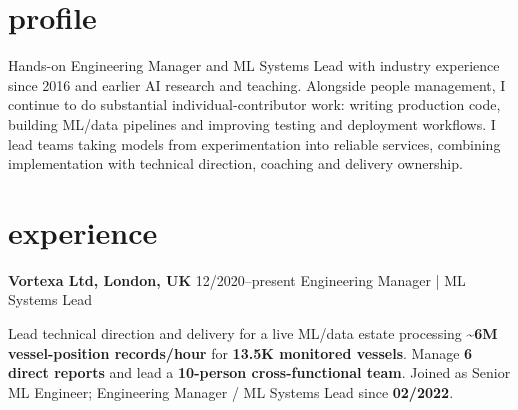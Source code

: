 \documentclass[]{../../../../friggeri-cv}
\renewcommand{\entry}[4]{%
  \parbox[t]{\dimexpr\textwidth-\entryleftinset\relax}{%
    \textbf{#2}%
    {\footnotesize\addfontfeature{Color=lightgray}\hspace{0.6em}#1}%
    \hfill%
    {\small\color{textcolor} #3}\\%
    #4\vspace{\parsep}%
  }\\}
\begin{document}
\section{profile}
{\normalsize Hands-on Engineering Manager and ML Systems Lead with industry experience since 2016 and earlier AI research and teaching. Alongside people management, I continue to do substantial individual-contributor work: writing production code, building ML/data pipelines and improving testing and deployment workflows. I lead teams taking models from experimentation into reliable services, combining implementation with technical direction, coaching and delivery ownership.}
\section{experience}
\begin{entrylist}
    \entry
    {12/2020--present}
    {Vortexa Ltd, London, UK}
    {Engineering Manager | ML Systems Lead}
    {
        {\small
        \setlength{\parindent}{0pt}
        \setlength{\leftskip}{0pt}
        Lead technical direction and delivery for a live ML/data estate processing \textbf{\textasciitilde6M vessel-position records/hour} for \textbf{13.5K monitored vessels}. Manage \textbf{6 direct reports} and lead a \textbf{10-person cross-functional team}. Joined as Senior ML Engineer; Engineering Manager / ML Systems Lead since \textbf{02/2022}.

}}
\end{entrylist}
\end{document}

